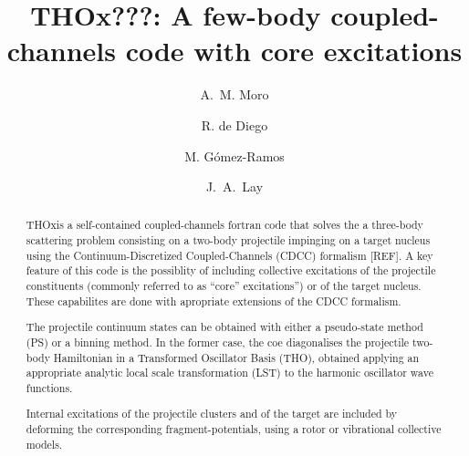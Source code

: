 \documentclass[preprint,12pt]{elsarticle}
\begin{document}
\newcommand{\etal}{\textit{et al.~}}
\newcommand{\be}{\begin{eqnarray}}
\newcommand{\ee}{\end{eqnarray}}
\newcommand{\bi}{\begin{itemize}}
\newcommand{\ei}{\end{itemize}}
\newcommand{\code}{THOx}
\newcommand{\vecr}{{\vec r}}
\newcommand{\vecR}{{\vec R}}


\begin{frontmatter}
\title{THOx???: A few-body coupled-channels code with core excitations}

\author[famn]{A.~M. Moro}
\author[famn]{R. de Diego}
\author[famn]{M. G\'omez-Ramos}
\address[famn]{Departamento de FAMN,
Universidad de Sevilla, Apartado 1065, E-41080 Seville, Spain}
\address[lisboa]{Centro de Ci\^encias e Tecnologias Nucleares, Instituto Superior T\'ecnico,
Universidade de Lisboa, Estrada Nacional 10 (Km 139,7), P-2695--066 Bobadela LRS, Portugal}
\author[padova,famn]{J.~A.~Lay}
\address[padova]{Dipartimento di Fisica Galileo Galilei and INFN, Via Marzolo 8, I-35131 Padova, Italy}



\begin{abstract}
\code is a self-contained coupled-channels fortran code that solves the a three-body scattering problem consisting on a two-body projectile impinging on a target nucleus using the Continuum-Discretized Coupled-Channels (CDCC) formalism [REF]. A key feature of this code is the possiblity of including collective excitations of the projectile constituents (commonly referred to as ``core'' excitations'') or of the target nucleus. These capabilites are done with apropriate extensions of the CDCC formalism. 

The projectile continuum states can be obtained with either a pseudo-state method (PS) or a binning method. In the former case, the coe diagonalises the projectile two-body Hamiltonian in a Transformed Oscillator Basis (THO),  obtained applying an appropriate analytic local scale transformation (LST) to the harmonic oscillator wave functions.

Internal excitations of the projectile clusters and  of the  target  are included by deforming the corresponding fragment-potentials, using a rotor or vibrational collective models.  


\end{abstract}
\end{frontmatter}
\end{document}
